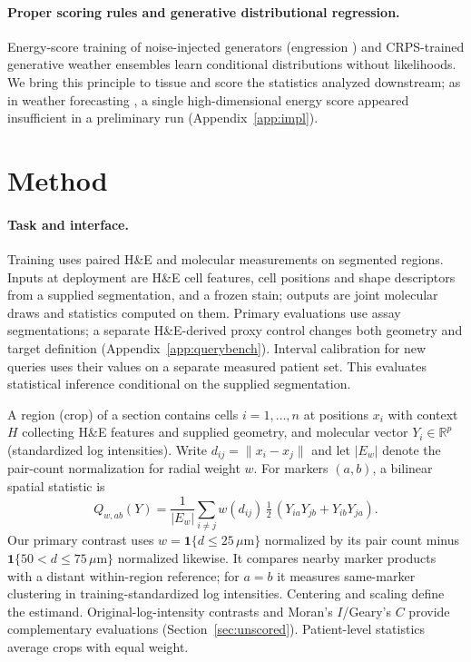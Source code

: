 \documentclass[10pt,letterpaper]{article}
\theoremstyle{definition}
\theoremstyle{remark}
\begin{document}
\paragraph{Proper scoring rules and generative distributional regression.} Energy-score training of noise-injected generators (engression \citep{engression2024}) and CRPS-trained generative weather ensembles \citep{fgn2025} learn conditional distributions without likelihoods. We bring this principle to tissue and score the statistics analyzed downstream; as in weather forecasting \citep{pinson2013,scheuerer2015}, a single high-dimensional energy score appeared insufficient in a preliminary run (Appendix~\ref{app:impl}).

\section{Method}
\label{sec:method}

\paragraph{Task and interface.} Training uses paired H\&E and molecular measurements on segmented regions. Inputs at deployment are H\&E cell features, cell positions and shape descriptors from a supplied segmentation, and a frozen stain; outputs are joint molecular draws and statistics computed on them. Primary evaluations use assay segmentations; a separate H\&E-derived proxy control changes both geometry and target definition (Appendix~\ref{app:querybench}). Interval calibration for new queries uses their values on a separate measured patient set. This evaluates statistical inference conditional on the supplied segmentation.

A region (crop) of a section contains cells $i=1,\dots,n$ at positions $x_i$ with context $H$ collecting H\&E features and supplied geometry, and molecular vector $Y_i\in\mathbb{R}^p$ (standardized log intensities). Write $d_{ij}=\lVert x_i-x_j\rVert$ and let $|E_w|$ denote the pair-count normalization for radial weight $w$. For markers $(a,b)$, a bilinear spatial statistic is
\begin{equation}
Q_{w,ab}(Y) = \frac{1}{|E_w|}\sum_{i\neq j} w(d_{ij})\,\tfrac12\,(Y_{ia}Y_{jb}+Y_{ib}Y_{ja}).
\end{equation}
Our primary contrast uses $w=\mathbf{1}\{d\le 25\,\mu\mathrm{m}\}$ normalized by its pair count minus $\mathbf{1}\{50<d\le75\,\mu\mathrm{m}\}$ normalized likewise. It compares nearby marker products with a distant within-region reference; for $a=b$ it measures same-marker clustering in training-standardized log intensities. Centering and scaling define the estimand. Original-log-intensity contrasts and Moran's $I$/Geary's $C$ provide complementary evaluations (Section~\ref{sec:unscored}). Patient-level statistics average crops with equal weight.
\end{document}

